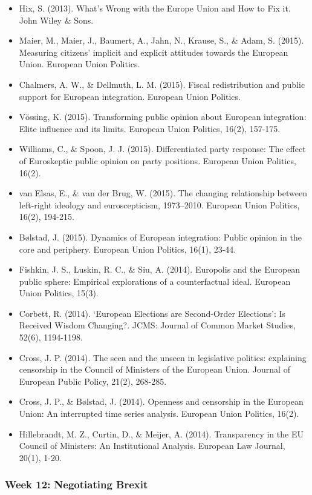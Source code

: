 \begin{itemize}
	\item Hix, S. (2013). What's Wrong with the Europe Union and How to Fix it. John Wiley \& Sons.
	\item Maier, M., Maier, J., Baumert, A., Jahn, N., Krause, S., \& Adam, S. (2015). Measuring citizens’ implicit and explicit attitudes towards the European Union. European Union Politics.
	\item Chalmers, A. W., \& Dellmuth, L. M. (2015). Fiscal redistribution and public support for European integration. European Union Politics.
	\item V{\"o}ssing, K. (2015). Transforming public opinion about European integration: Elite influence and its limits. European Union Politics, 16(2), 157-175.
	\item Williams, C., \& Spoon, J. J. (2015). Differentiated party response: The effect of Euroskeptic public opinion on party positions. European Union Politics, 16(2).
	\item van Elsas, E., \& van der Brug, W. (2015). The changing relationship between left-right ideology and euroscepticism, 1973–2010. European Union Politics, 16(2), 194-215.
	\item B{\o}lstad, J. (2015). Dynamics of European integration: Public opinion in the core and periphery. European Union Politics, 16(1), 23-44.
	\item Fishkin, J. S., Luskin, R. C., \& Siu, A. (2014). Europolis and the European public sphere: Empirical explorations of a counterfactual ideal. European Union Politics, 15(3).
	\item Corbett, R. (2014). `European Elections are Second-Order Elections': Is Received Wisdom Changing?. JCMS: Journal of Common Market Studies, 52(6), 1194-1198.
	\item Cross, J. P. (2014). The seen and the unseen in legislative politics: explaining censorship in the Council of Ministers of the European Union. Journal of European Public Policy, 21(2), 268-285.
	\item Cross, J. P., \& B{\o}lstad, J. (2014). Openness and censorship in the European Union: An interrupted time series analysis. European Union Politics, 16(2).
	\item Hillebrandt, M. Z., Curtin, D., \& Meijer, A. (2014). Transparency in the EU Council of Ministers: An Institutional Analysis. European Law Journal, 20(1), 1-20.
\end{itemize}


\subsubsection*{Week 12: Negotiating Brexit}

